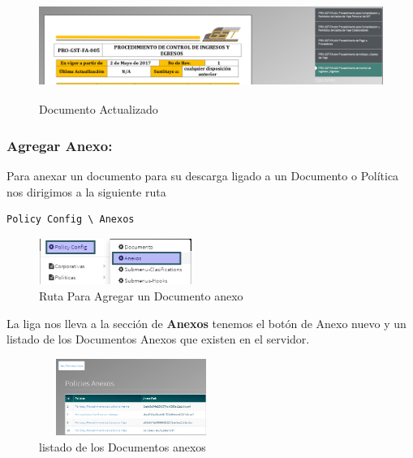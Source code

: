 \documentclass[12pt,letterpaper]{article}
\begin{document}
\begin{subsection}{\color{blackgreen}}
{        \begin{figure}[htb]
          \centering
          \includegraphics[angle=0,width=140mm,height=34mm]{img/Selection_063.png}
          \caption{Documento Actualizado}
          \label{sel63}
        \end{figure}
\newpage
        \subsubsection{Agregar Anexo:}

        Para anexar un documento para su descarga ligado a un Documento o Pol\'itica
        nos dirigimos a la siguiente ruta
        \begin{lstlisting}[caption=Ruta Anexo,style=customc]
          Policy Config \ Anexos
        \end{lstlisting}

        \begin{figure}[htb]
          \centering
          \includegraphics[angle=0,width=50mm,height=15mm]{img/Menu_066.png}
          \caption{Ruta Para Agregar un Documento anexo}
          \label{men66}
        \end{figure}

        La liga nos lleva a la secci\'on de \textbf{Anexos} tenemos el bot\'on de Anexo nuevo
        y un listado de los Documentos Anexos que existen en el servidor.

        \begin{figure}[htb]
          \centering
          \includegraphics[angle=0,width=60mm,height=25mm]{img/Selection_067.png}
          \caption{listado de los Documentos anexos}
          \label{sel67}
        \end{figure}

}
\end{subsection}
\end{document}

